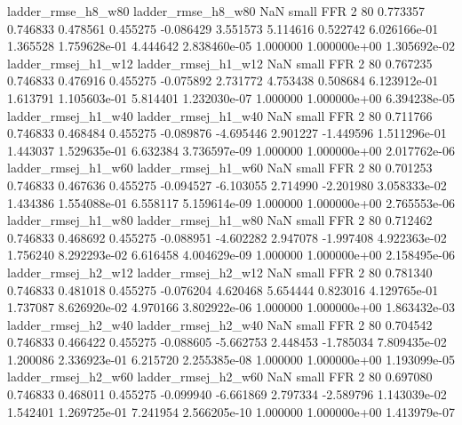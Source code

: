       ladder_rmse_h8_w80       ladder_rmse_h8_w80                   NaN      small      FFR                 2 80 0.773357       0.746833 0.478561       0.455275   -0.086429      3.551573      5.114616     0.522742   6.026166e-01  1.365528 1.759628e-01     4.444642   2.838460e-05            1.000000    1.000000e+00        1.305692e-02
     ladder_rmsej_h1_w12      ladder_rmsej_h1_w12                   NaN      small      FFR                 2 80 0.767235       0.746833 0.476916       0.455275   -0.075892      2.731772      4.753438     0.508684   6.123912e-01  1.613791 1.105603e-01     5.814401   1.232030e-07            1.000000    1.000000e+00        6.394238e-05
     ladder_rmsej_h1_w40      ladder_rmsej_h1_w40                   NaN      small      FFR                 2 80 0.711766       0.746833 0.468484       0.455275   -0.089876     -4.695446      2.901227    -1.449596   1.511296e-01  1.443037 1.529635e-01     6.632384   3.736597e-09            1.000000    1.000000e+00        2.017762e-06
     ladder_rmsej_h1_w60      ladder_rmsej_h1_w60                   NaN      small      FFR                 2 80 0.701253       0.746833 0.467636       0.455275   -0.094527     -6.103055      2.714990    -2.201980   3.058333e-02  1.434386 1.554088e-01     6.558117   5.159614e-09            1.000000    1.000000e+00        2.765553e-06
     ladder_rmsej_h1_w80      ladder_rmsej_h1_w80                   NaN      small      FFR                 2 80 0.712462       0.746833 0.468692       0.455275   -0.088951     -4.602282      2.947078    -1.997408   4.922363e-02  1.756240 8.292293e-02     6.616458   4.004629e-09            1.000000    1.000000e+00        2.158495e-06
     ladder_rmsej_h2_w12      ladder_rmsej_h2_w12                   NaN      small      FFR                 2 80 0.781340       0.746833 0.481018       0.455275   -0.076204      4.620468      5.654444     0.823016   4.129765e-01  1.737087 8.626920e-02     4.970166   3.802922e-06            1.000000    1.000000e+00        1.863432e-03
     ladder_rmsej_h2_w40      ladder_rmsej_h2_w40                   NaN      small      FFR                 2 80 0.704542       0.746833 0.466422       0.455275   -0.088605     -5.662753      2.448453    -1.785034   7.809435e-02  1.200086 2.336923e-01     6.215720   2.255385e-08            1.000000    1.000000e+00        1.193099e-05
     ladder_rmsej_h2_w60      ladder_rmsej_h2_w60                   NaN      small      FFR                 2 80 0.697080       0.746833 0.468011       0.455275   -0.099940     -6.661869      2.797334    -2.589796   1.143039e-02  1.542401 1.269725e-01     7.241954   2.566205e-10            1.000000    1.000000e+00        1.413979e-07
